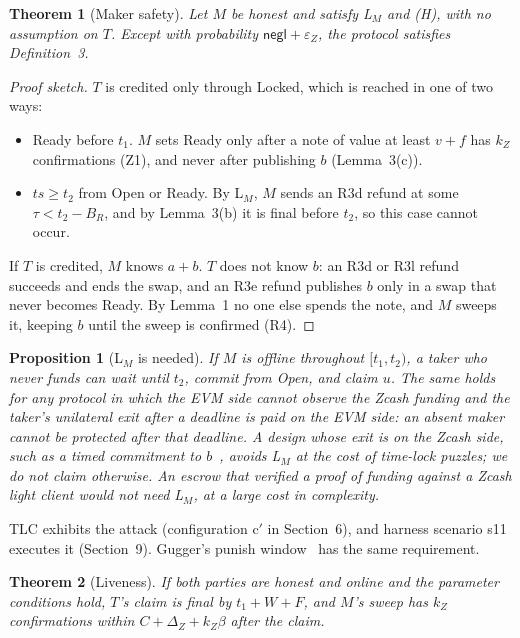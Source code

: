\documentclass[10pt,letterpaper]{article}
\theoremstyle{plain}
\newtheorem{theorem}{Theorem}
\newtheorem{proposition}{Proposition}
\theoremstyle{definition}
\newcommand{\st}[1]{\textsf{#1}}
\begin{document}
\begin{theorem}[Maker safety]
Let $M$ be honest and satisfy L$_M$ and (H), with no assumption on $T$. Except with probability
$\mathsf{negl}+\varepsilon_Z$, the protocol satisfies Definition~3.
\end{theorem}
\begin{proof}[Proof sketch]
$T$ is credited only through \st{Locked}, which is reached in one of two ways:
\begin{itemize}\setlength\itemsep{0.05em}
\item \st{Ready} before $t_1$. $M$ sets Ready only after a note of value at least $v+f$ has $k_Z$
confirmations (Z1), and never after publishing $b$ (Lemma~3(c)).
\item $ts \ge t_2$ from \st{Open} or \st{Ready}. By L$_M$, $M$ sends an R3d refund at some
$\tau < t_2 - B_R$, and by Lemma~3(b) it is final before $t_2$, so this case cannot occur.
\end{itemize}
If $T$ is credited, $M$ knows $a+b$. $T$ does not know $b$: an R3d or R3l refund succeeds and ends
the swap, and an R3e refund publishes $b$ only in a swap that never becomes Ready. By Lemma~1 no
one else spends the note, and $M$ sweeps it, keeping $b$ until the sweep is confirmed (R4).
\end{proof}

\begin{proposition}[L$_M$ is needed]
If $M$ is offline throughout $[t_1, t_2)$, a taker who never funds can wait until $t_2$, commit
from \st{Open}, and claim $u$. The same holds for any protocol in which the EVM side cannot
observe the Zcash funding and the taker's unilateral exit after a deadline is paid on the EVM
side: an absent maker cannot be protected after that deadline. A design whose exit is on the
Zcash side, such as a timed commitment to $b$~\cite{uas}, avoids L$_M$ at the cost of
time-lock puzzles; we do not claim otherwise. An escrow that verified a proof of funding against a
Zcash light client would not need L$_M$, at a large cost in complexity.
\end{proposition}
TLC exhibits the attack (configuration c$'$ in Section~6), and harness scenario s11 executes it
(Section~9). Gugger's punish window~\cite{gugger} has the same requirement.

\begin{theorem}[Liveness]
If both parties are honest and online and the parameter conditions hold, $T$'s claim is final by
$t_1 + W + F$, and $M$'s sweep has $k_Z$ confirmations within $C + \Delta_Z + k_Z\beta$ after
the claim.
\end{theorem}
\end{document}
